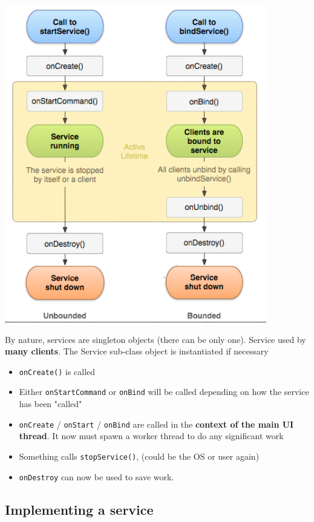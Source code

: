 \documentclass{article}
\begin{document}
\begin{center}
  \includegraphics[scale=0.8]{threads.png}
\end{center}

By nature, services are singleton objects (there can be only one). Service used by \textbf{many clients}. The Service sub-class object is instantiated if necessary
\begin{itemize}
  \item \texttt{onCreate()} is called
  \item Either \texttt{onStartCommand} or \texttt{onBind} will be called depending on how the service has been "called"
  \item \texttt{onCreate} / \texttt{onStart} / \texttt{onBind} are called in the \textbf{context of the main UI thread}. It now must spawn a worker thread to do any significant work
  \item Something calls \texttt{stopService()}, (could be the OS or user again)
  \item \texttt{onDestroy} can now be used to save work.
\end{itemize}

\subsection{Implementing a service}
\end{document}
